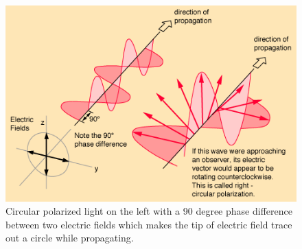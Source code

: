 \documentclass[ notitlepage, numerical, 11pt]{revtex4-1} %
\begin{document}
\begin{figure}[H]
\centerline{\includegraphics[scale=1]{polcir.png}}
\caption{Circular polarized light on the left with a 90 degree phase difference between two electric fields which makes the tip of electric field trace out a circle while propagating\cite{wikiPic}.}
\label{circular}
\end{figure} 
\end{document}
